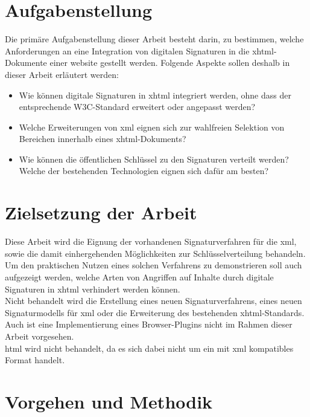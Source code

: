 \section{Aufgabenstellung}
%
\label{sec:Einleitung:aufgabenstellung}
Die primäre Aufgabenstellung dieser Arbeit besteht darin, zu bestimmen, welche Anforderungen an eine Integration von digitalen Signaturen in die
\gls{xhtml}-Dokumente einer \gls{website} gestellt werden. Folgende Aspekte sollen deshalb in dieser Arbeit erläutert werden:
\begin{itemize}
    \item Wie können digitale Signaturen in \gls{xhtml} integriert werden, ohne dass der entsprechende W3C-Standard\cite{xhtml:w3c} erweitert oder angepasst
    werden?
    \item Welche Erweiterungen von \gls{xml} eignen sich zur wahlfreien Selektion von Bereichen innerhalb eines \gls{xhtml}-Dokuments?
    \item Wie können die öffentlichen Schlüssel zu den Signaturen verteilt werden? Welche der bestehenden Technologien eignen sich dafür am besten?
\end{itemize}

\section{Zielsetzung der Arbeit}
\label{sec:Einleitung:ziele}
Diese Arbeit wird die Eignung der vorhandenen Signaturverfahren für die \gls{xml}, sowie die damit einhergehenden Möglichkeiten zur Schlüsselverteilung
behandeln. Um den praktischen Nutzen eines solchen Verfahrens zu demonstrieren soll auch aufgezeigt werden, welche Arten von Angriffen auf Inhalte durch
digitale Signaturen in \gls{xhtml} verhindert werden können.\\

Nicht behandelt wird die Erstellung eines neuen Signaturverfahrens, eines neuen Signaturmodells für \gls{xml} oder die Erweiterung des bestehenden
\gls{xhtml}-Standards. Auch ist eine Implementierung eines Browser-Plugins nicht im Rahmen dieser Arbeit vorgesehen.\\
\gls{html} wird nicht behandelt, da es sich dabei nicht um ein mit \gls{xml} kompatibles Format handelt.

\section{Vorgehen und Methodik}
\label{sec:Einleitung:methodik}


